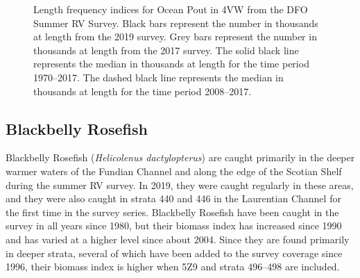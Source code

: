 \documentclass[11pt]{book}
\begin{document}
\begin{figure}[htb]

{\centering {} 

}

\caption{Length frequency indices for Ocean Pout in 4VW from the DFO Summer RV Survey. Black bars represent the number in thousands at length from the 2019 survey. Grey bars represent the number in thousands at length from the 2017 survey. The solid black line represents the median in thousands at length for the time period 1970--2017. The dashed black line represents the median in thousands at length for the time period 2008--2017.}\label{fig:122-fig-oceanpout-lengthfreq4VW}
\end{figure}
\clearpage

\hypertarget{blackbelly-rosefish}{%
\subsection{Blackbelly Rosefish}\label{blackbelly-rosefish}}

Blackbelly Rosefish (\emph{Helicolenus dactylopterus}) are caught primarily in the deeper warmer waters of the Fundian Channel and along the edge of the Scotian Shelf during the summer RV survey. In 2019, they were caught regularly in these areas, and they were also caught in strata 440 and 446 in the Laurentian Channel for the first time in the survey series. Blackbelly Rosefish have been caught in the survey in all years since 1980, but their biomass index has increased since 1990 and has varied at a higher level since about 2004. Since they are found primarily in deeper strata, several of which have been added to the survey coverage since 1996, their biomass index is higher when 5Z9 and strata 496--498 are included.
\end{document}
